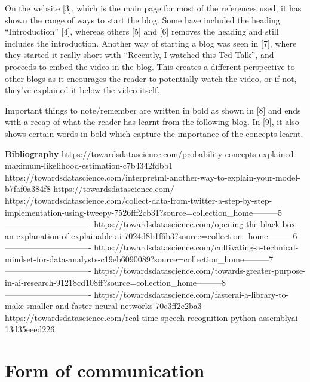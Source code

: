 \documentclass[12pt, a4paper,oneside]{book}
\numberwithin{equation}{section}
\begin{document}
On the website [3], which is the main page for most of the references used, it has shown the range of ways to start the blog. Some have included the heading “Introduction” [4], whereas others [5] and [6] removes the heading and still includes the introduction. Another way of starting a blog was seen in [7], where they started it really short with “Recently, I watched this Ted Talk”, and proceeds to embed the video in the blog. This creates a different perspective to other blogs as it encourages the reader to potentially watch the video, or if not, they’ve explained it below the video itself.

Important things to note/remember are written in bold as shown in [8] and ends with a recap of what the reader has learnt from the following blog. In [9], it also shows certain words in bold which capture the importance of the concepts learnt.


\textbf{Bibliography}
\newline [1] https://towardsdatascience.com/probability-concepts-explained-maximum-likelihood-estimation-c7b4342fdbb1
\newline [2] https://towardsdatascience.com/interpretml-another-way-to-explain-your-model-b7faf0a384f8
\newline [3] https://towardsdatascience.com/
\newline [4] https://towardsdatascience.com/collect-data-from-twitter-a-step-by-step-implementation-using-tweepy-7526fff2cb31?source=collection_home---------5-------------------------------
\newline [5] https://towardsdatascience.com/opening-the-black-box-an-explanation-of-explainable-ai-7024d8b1f6b3?source=collection_home---------6-------------------------------
\newline [6] https://towardsdatascience.com/cultivating-a-technical-mindset-for-data-analysts-c19eb6090089?source=collection_home---------7-------------------------------
\newline [7] https://towardsdatascience.com/towards-greater-purpose-in-ai-research-91218cd108ff?source=collection_home---------8-------------------------------
\newline [8] https://towardsdatascience.com/fasterai-a-library-to-make-smaller-and-faster-neural-networks-70c3ff2e2ba3
\newline [9] https://towardsdatascience.com/real-time-speech-recognition-python-assemblyai-13d35eeed226

\section{Form of communication}\label{sec:x.x}
\end{document}
